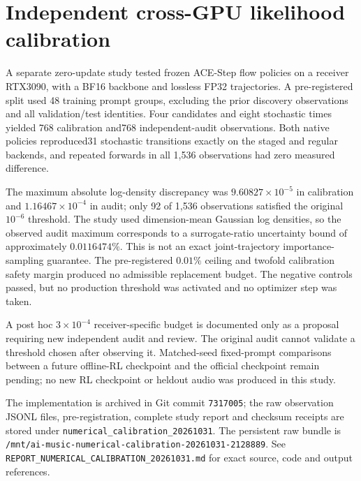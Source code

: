 \section{Independent cross-GPU likelihood calibration}
\label{sec:cross-gpu-calibration}
A separate zero-update study tested frozen ACE-Step flow policies on a receiver RTX3090, with a BF16 backbone and lossless FP32 trajectories. A pre-registered split used 48 training prompt groups, excluding the prior discovery observations and all validation/test identities. Four candidates and eight stochastic times yielded 768 calibration and768 independent-audit observations. Both native policies reproduced31 stochastic transitions exactly on the staged and regular backends, and repeated forwards in all 1,536 observations had zero measured difference.

The maximum absolute log-density discrepancy was $9.60827\times10^{-5}$ in calibration and $1.16467\times10^{-4}$ in audit; only 92 of 1,536 observations satisfied the original $10^{-6}$ threshold. The study used dimension-mean Gaussian log densities, so the observed audit maximum corresponds to a surrogate-ratio uncertainty bound of approximately $0.0116474\%$. This is not an exact joint-trajectory importance-sampling guarantee. The pre-registered $0.01\%$ ceiling and twofold calibration safety margin produced no admissible replacement budget. The negative controls passed, but no production threshold was activated and no optimizer step was taken.

A post hoc $3\times10^{-4}$ receiver-specific budget is documented only as a proposal requiring new independent audit and review. The original audit cannot validate a threshold chosen after observing it. Matched-seed fixed-prompt comparisons between a future offline-RL checkpoint and the official checkpoint remain pending; no new RL checkpoint or heldout audio was produced in this study.

The implementation is archived in Git commit \texttt{7317005}; the raw observation JSONL files, pre-registration, complete study report and checksum receipts are stored under \texttt{numerical\_calibration\_20261031}. The persistent raw bundle is \texttt{/mnt/ai-music-numerical-calibration-20261031-2128889}. See \texttt{REPORT\_NUMERICAL\_CALIBRATION\_20261031.md} for exact source, code and output references.
